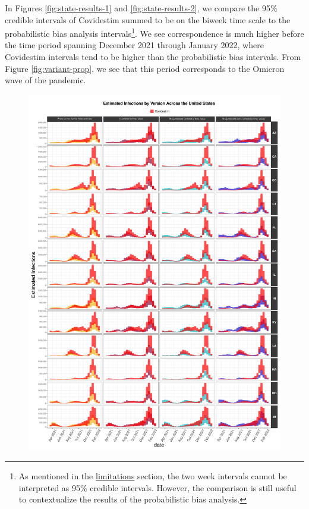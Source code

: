 \documentclass[12pt,twoside]{smiththesis}
\begin{document}
In Figures \ref{fig:state-results-1} and \ref{fig:state-results-2}, we compare the 95\% credible intervals of Covidestim summed to be on the biweek time scale to the probabilistic bias analysis intervals\footnote{As mentioned in the \protect\hyperlink{lims}{limitations} section, the two week intervals cannot be interpreted as 95\% credible intervals. However, the comparison is still useful to contextualize the results of the probabilistic bias analysis.}. We see correspondence is much higher before the time period spanning December 2021 through January 2022, where Covidestim intervals tend to be higher than the probabilistic bias intervals. From Figure \ref{fig:variant-prop}, we see that this period corresponds to the Omicron wave of the pandemic.
\begin{figure}
\includegraphics[width=1\linewidth]{figure/state_comp_covidestim1} \caption{\label{fig:state-results-1}}\label{fig:unnamed-chunk-4}
\end{figure}
\end{document}
